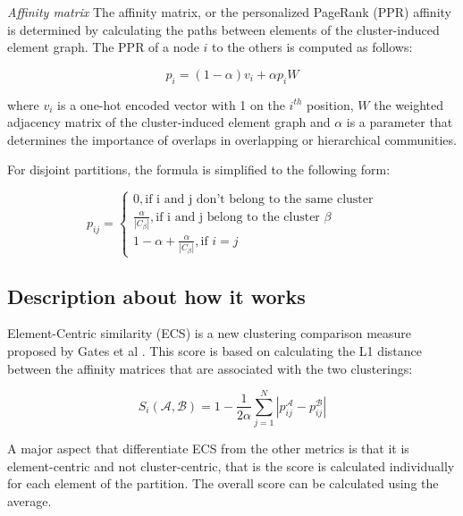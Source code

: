     \textit{Affinity matrix} The affinity matrix, or the personalized PageRank (PPR) affinity is determined by calculating the paths between elements of the cluster-induced element graph. The PPR of a node $i$ to the others is computed as follows:

    \[ p_i = (1 - \alpha) v_i + \alpha p_i W \]

    where $v_i$ is a one-hot encoded vector with 1 on the $i^{th}$ position, $W$ the weighted adjacency matrix of the cluster-induced element graph and $\alpha$ is a parameter that determines the importance of overlaps in overlapping or hierarchical communities.

    For disjoint partitions, the formula is simplified to the following form:

    \begin{equation} \label{eq:affinity-disjoin}
        p_{ij} = 
        \begin{cases}
            0, \text{if i and j don't belong to the same cluster} \\
            \frac{\alpha}{|C_\beta|}, \text{if i and j belong to the cluster } \beta \\
            1 - \alpha + \frac{\alpha}{|C_\beta|}, \text{if } i = j
        \end{cases}
    \end{equation}
    
    \subsection{Description about how it works}

    Element-Centric similarity (ECS) is a new clustering comparison measure proposed by Gates et al \cite{Gates2019}. This score is based on calculating the L1 distance between the affinity matrices that are associated with the two clusterings:

    \begin{equation} \label{eq:def-ecs}
        S_i (\mathcal{A}, \mathcal{B}) = 1 - \frac{1}{2 \alpha} \sum_{j = 1}^N |p_{ij}^{\mathcal{A}} - p_{ij}^{\mathcal{B}} | 
    \end{equation}

    A major aspect that differentiate ECS from the other metrics is that it is element-centric and not cluster-centric, that is the score is calculated individually for each element of the partition. The overall score can be calculated using the average.

